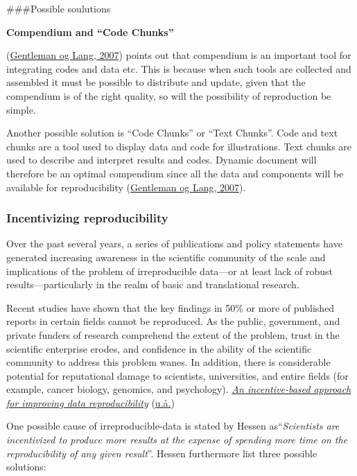 \documentclass[
  12pt,
  norsk,
]{article}
\begin{document}
\#\#\#Possible soulutions

\textbf{Compendium and ``Code Chunks''}

(\protect\hyperlink{ref-gentleman2007}{Gentleman og Lang, 2007}) points
out that compendium is an important tool for integrating codes and data
etc. This is because when such tools are collected and assembled it must
be possible to distribute and update, given that the compendium is of
the right quality, so will the possibility of reproduction be simple.

Another possible solution is ``Code Chunks'' or ``Text Chunks''. Code
and text chunks are a tool used to display data and code for
illustrations. Text chunks are used to describe and interpret results
and codes. Dynamic document will therefore be an optimal compendium
since all the data and components will be available for reproducibility
(\protect\hyperlink{ref-gentleman2007}{Gentleman og Lang, 2007}).

\hypertarget{incentivizing-reproducibility}{%
\subsubsection{Incentivizing
reproducibility}\label{incentivizing-reproducibility}}

Over the past several years, a series of publications and policy
statements have generated increasing awareness in the scientific
community of the scale and implications of the problem of irreproducible
data---or at least lack of robust results---particularly in the realm of
basic and translational research.

Recent studies have shown that the key findings in 50\% or more of
published reports in certain fields cannot be reproduced. As the public,
government, and private funders of research comprehend the extent of the
problem, trust in the scientific enterprise erodes, and confidence in
the ability of the scientific community to address this problem wanes.
In addition, there is considerable potential for reputational damage to
scientists, universities, and entire fields (for example, cancer
biology, genomics, and psychology).
\protect\hyperlink{ref-Science.org}{\emph{An incentive-based approach
for improving data reproducibility}}
(\protect\hyperlink{ref-Science.org}{u.å.})

One possible cause of irreproducible-data is stated by Hessen
as``\emph{Scientists are incentivized to produce more results at the
expense of spending more time on the reproducibility of any given
result}''. Hessen furthermore list three possible solutions:
\end{document}
